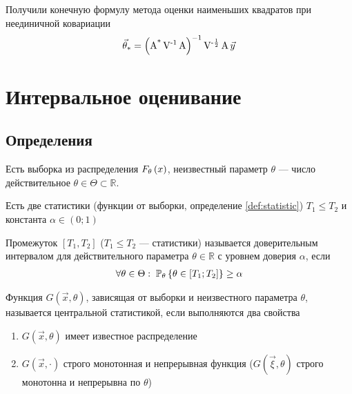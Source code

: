 Получили конечную формулу метода оценки наименьших квадратов при неединичной
ковариации
\begin{equation}\label{eq:leastSquares:formulaAdvanced}
  \index{оценка!метода наименьших квадратов!формула}
  \vec{\theta}_*
  = \left( \operatorname{A^*} \operatorname{V^{-1}}
      \operatorname{A} \right)^{-1}
      \operatorname{V^{-\frac{1}{2}}} \operatorname{A} \vec{y}
\end{equation}

\section{Интервальное оценивание}
\subsection{Определения}

Есть выборка \xsample из распределения $\cdfof{\theta}{x}$,
неизвестный параметр $\theta$ --- число действительное
$\theta \in \Theta \subset \mathbb{R}$.

Есть две статистики (функции от выборки, определение \ref{def:statistic})
$T_1 \le T_2$ и константа $\alpha \in \left( 0; 1 \right)$

\begin{definition}
  Промежуток $\left[ T_1, T_2 \right]$ ($T_1 \le T_2$ --- статистики)
  называется доверительным интервалом для действительного параметра
  $\theta \in \mathbb{R}$ с уровнем доверия $\alpha$, если
  \begin{align*}
      \forall \theta \in \Theta:\;
      \Probability[\theta]{\theta \in \left[ T_1; T_2 \right]} \ge \alpha
  \end{align*}
\end{definition}

\begin{definition}
  Функция $G\left( \vec{x}, \theta \right)$, зависящая от выборки и
  неизвестного параметра $\theta$, называется центральной статистикой,
  если выполняются два свойства
  \begin{enumerate}
      \item $G\left( \vec{x}, \theta \right)$ имеет известное распределение
      \item $G\left( \vec{x}, \cdot \right)$ строго монотонная и непрерывная
      функция ($G\left( \vec{\xi}, \theta \right)$ строго монотонна и
      непрерывна по $\theta$)
  \end{enumerate}
\end{definition}

